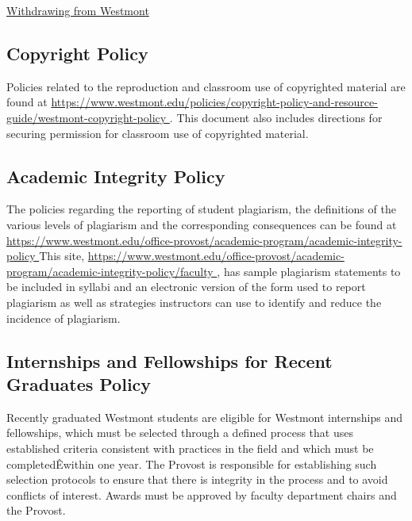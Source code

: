 		\href{https://www.westmont.edu/office-registrar/academic-policies-and-procedures/withdrawing-westmont-college} {Withdrawing from Westmont}



	\subsection{Copyright Policy}
		Policies related to the reproduction and classroom use of copyrighted
		material are found at
		\href{
			https://www.westmont.edu/policies/copyright-policy-and-resource-guide/westmont-copyright-policy
		}{\url{
				https://www.westmont.edu/policies/copyright-policy-and-resource-guide/westmont-copyright-policy
			}}
		.
		This document also includes directions for securing permission for classroom use of copyrighted material.
	\subsection{Academic Integrity Policy}
		The policies regarding the reporting of student plagiarism, the definitions
		of the various levels of plagiarism and the corresponding consequences can be
		found at
		\href{
			https://www.westmont.edu/office-provost/academic-program/academic-integrity-policy
		}
		{\url{
				https://www.westmont.edu/office-provost/academic-program/academic-integrity-policy
			}}
		This site,
		\href{
			https://www.westmont.edu/office-provost/academic-program/academic-integrity-policy/faculty
		}
		{\url{
				https://www.westmont.edu/office-provost/academic-program/academic-integrity-policy/faculty
			}},
		has sample plagiarism statements to be included
		in syllabi and an electronic version of the form used to report plagiarism as well as strategies instructors can use to identify and reduce the incidence of plagiarism.
	\subsection{Internships and Fellowships for Recent Graduates Policy}
		Recently graduated Westmont students are eligible for Westmont internships and fellowships, which must be selected through a defined process that uses established criteria consistent with practices in the field and which must be completedÊwithin one year. The Provost is responsible for establishing such selection protocols to ensure that there is integrity in the process and to avoid conflicts of interest. Awards must be approved by faculty department chairs and the Provost.
